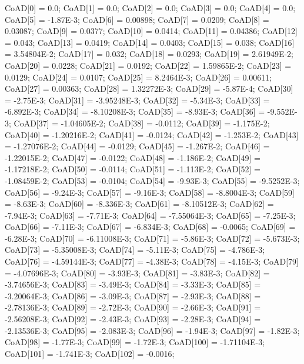 \begin{code}
\begin{hide}
{      CoAD[0] = 0.0;
      CoAD[1] = 0.0;
      CoAD[2] = 0.0;
      CoAD[3] = 0.0;
      CoAD[4] = 0.0;
      CoAD[5] = -1.87E-3;
      CoAD[6] = 0.00898;
      CoAD[7] = 0.0209;
      CoAD[8] = 0.03087;
      CoAD[9] = 0.0377;
      CoAD[10] = 0.0414;
      CoAD[11] = 0.04386;
      CoAD[12] = 0.043;
      CoAD[13] = 0.0419;
      CoAD[14] = 0.0403;
      CoAD[15] = 0.038;
      CoAD[16] = 3.54804E-2;
      CoAD[17] = 0.032;
      CoAD[18] = 0.0293;
      CoAD[19] = 2.61949E-2;
      CoAD[20] = 0.0228;
      CoAD[21] = 0.0192;
      CoAD[22] = 1.59865E-2;
      CoAD[23] = 0.0129;
      CoAD[24] = 0.0107;
      CoAD[25] = 8.2464E-3;
      CoAD[26] = 0.00611;
      CoAD[27] = 0.00363;
      CoAD[28] = 1.32272E-3;
      CoAD[29] = -5.87E-4;
      CoAD[30] = -2.75E-3;
      CoAD[31] = -3.95248E-3;
      CoAD[32] = -5.34E-3;
      CoAD[33] = -6.892E-3;
      CoAD[34] = -8.10208E-3;
      CoAD[35] = -8.93E-3;
      CoAD[36] = -9.552E-3;
      CoAD[37] = -1.04605E-2;
      CoAD[38] = -0.0112;
      CoAD[39] = -1.175E-2;
      CoAD[40] = -1.20216E-2;
      CoAD[41] = -0.0124;
      CoAD[42] = -1.253E-2;
      CoAD[43] = -1.27076E-2;
      CoAD[44] = -0.0129;
      CoAD[45] = -1.267E-2;
      CoAD[46] = -1.22015E-2;
      CoAD[47] = -0.0122;
      CoAD[48] = -1.186E-2;
      CoAD[49] = -1.17218E-2;
      CoAD[50] = -0.0114;
      CoAD[51] = -1.113E-2;
      CoAD[52] = -1.08459E-2;
      CoAD[53] = -0.0104;
      CoAD[54] = -9.93E-3;
      CoAD[55] = -9.5252E-3;
      CoAD[56] = -9.24E-3;
      CoAD[57] = -9.16E-3;
      CoAD[58] = -8.8004E-3;
      CoAD[59] = -8.63E-3;
      CoAD[60] = -8.336E-3;
      CoAD[61] = -8.10512E-3;
      CoAD[62] = -7.94E-3;
      CoAD[63] = -7.71E-3;
      CoAD[64] = -7.55064E-3;
      CoAD[65] = -7.25E-3;
      CoAD[66] = -7.11E-3;
      CoAD[67] = -6.834E-3;
      CoAD[68] = -0.0065;
      CoAD[69] = -6.28E-3;
      CoAD[70] = -6.11008E-3;
      CoAD[71] = -5.86E-3;
      CoAD[72] = -5.673E-3;
      CoAD[73] = -5.35008E-3;
      CoAD[74] = -5.11E-3;
      CoAD[75] = -4.786E-3;
      CoAD[76] = -4.59144E-3;
      CoAD[77] = -4.38E-3;
      CoAD[78] = -4.15E-3;
      CoAD[79] = -4.07696E-3;
      CoAD[80] = -3.93E-3;
      CoAD[81] = -3.83E-3;
      CoAD[82] = -3.74656E-3;
      CoAD[83] = -3.49E-3;
      CoAD[84] = -3.33E-3;
      CoAD[85] = -3.20064E-3;
      CoAD[86] = -3.09E-3;
      CoAD[87] = -2.93E-3;
      CoAD[88] = -2.78136E-3;
      CoAD[89] = -2.72E-3;
      CoAD[90] = -2.66E-3;
      CoAD[91] = -2.56208E-3;
      CoAD[92] = -2.43E-3;
      CoAD[93] = -2.28E-3;
      CoAD[94] = -2.13536E-3;
      CoAD[95] = -2.083E-3;
      CoAD[96] = -1.94E-3;
      CoAD[97] = -1.82E-3;
      CoAD[98] = -1.77E-3;
      CoAD[99] = -1.72E-3;
      CoAD[100] = -1.71104E-3;
      CoAD[101] = -1.741E-3;
      CoAD[102] = -0.0016;
   }
\end{hide}


\end{code}
